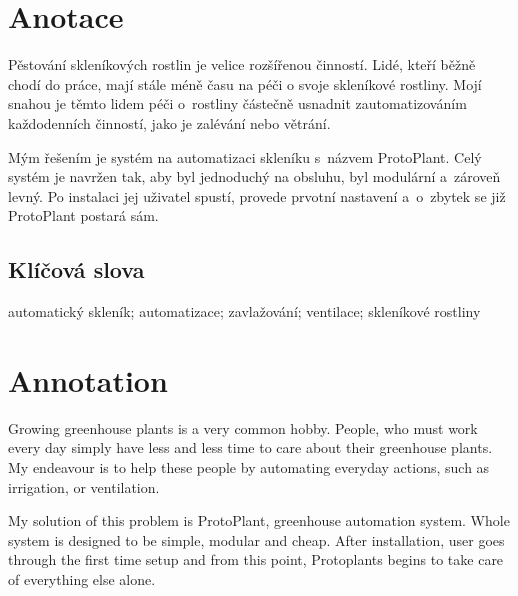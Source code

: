 \documentclass{template/socthesis}
\author{Petr Štourač}
\begin{document}
	
	\maketitle
	
	
	
	\pagestyle{empty}
	
	\section*{Anotace}

    Pěstování skleníkových rostlin je velice roz\-ší\-řenou činností.
	Lidé, kteří běžně chodí do práce, mají stále méně času na péči o svoje skleníkové rostliny.
	Mojí snahou je těmto lidem péči o~rostliny částečně usnadnit zautomatizováním každodenních činností, jako je zalévání nebo větrání.
	
	Mým řešením je systém na automatizaci skleníku s~názvem ProtoPlant.
	Celý systém je navržen tak, aby byl jednoduchý na obsluhu, byl modulární a~zároveň levný. 
	Po instalaci jej uživatel spustí, provede prvotní nastavení 
	a~o~zbytek se již ProtoPlant postará sám.
	
	\subsection*{Klíčová slova}
	automatický skleník; automatizace; zavlažování; ventilace; skleníkové rostliny
		
	\section*{Annotation}
    Growing greenhouse plants is a very common hobby.
    People, who must work every day simply have less and less time to care about their greenhouse plants.
    My endeavour is to help these people by automating everyday actions, such as irrigation, or ventilation.
	
	My solution of this problem is ProtoPlant, greenhouse automation system.
	Whole system is designed to be simple, modular and cheap.
	After installation, user goes through the first time setup and from this point, Protoplants begins to take care of everything else alone.
	
\end{document}
